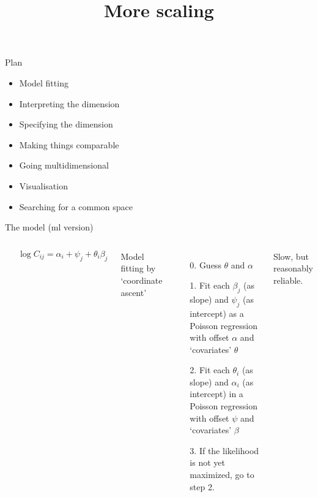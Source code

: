 \documentclass{hertieteaching}
\title{More scaling}
\begin{document}
{
\begin{frame}
\maketitle
\end{frame}}
\addtocounter{page}{-1}

\begin{frame}{Plan}
\begin{itemize}
  \item Model fitting
  \item Interpreting the dimension
  \item Specifying the dimension
  \item Making things comparable
  \item Going multidimensional
  \item Visualisation
  \item Searching for a common space
\end{itemize}

\end{frame}

\begin{frame}{The model (ml version)}

\begin{columns}[T,onlytextwidth]

\begin{center}
\end{center}

\medskip
\smallskip
$$
\log C_\mathit{ij} = \alpha_i + \psi_j + \theta_i \beta_j
$$

Model fitting by `coordinate ascent' \parencite{Goodman1979}
\begin{itemize}
  \item[0.] Guess $\theta$ and $\alpha$
  \item[1.] Fit each $\beta_j$ (as slope) and $\psi_j$ (as intercept) as a Poisson regression with offset $\alpha$ and `covariates' $\theta$
  \item[2.] Fit each $\theta_i$ (as slope) and $\alpha_i$ (as intercept) in a  Poisson regression with offset $\psi$ and `covariates' $\beta$
  \item[3.] If the likelihood is not yet maximized, go to step 2. 
\end{itemize}
Slow, but reasonably reliable.
\end{columns}

\end{frame}
\end{document}
